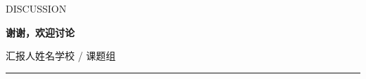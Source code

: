 \documentclass[aspectratio=169,11pt]{beamer}
\begin{document}
\begin{frame}[plain]
  \vfill
  {\color{Teal}\small DISCUSSION\par}
  \vspace{6mm}
  {\color{Navy}\LARGE\bfseries 谢谢，欢迎讨论\par}
  \vspace{5mm}
  {\color{Muted}\normalsize 汇报人姓名\quad 学校 / 课题组\par}
  \vspace{6mm}
  {\color{Teal}\rule{20mm}{1.2pt}\par}
  \vfill
\end{frame}
\end{document}
